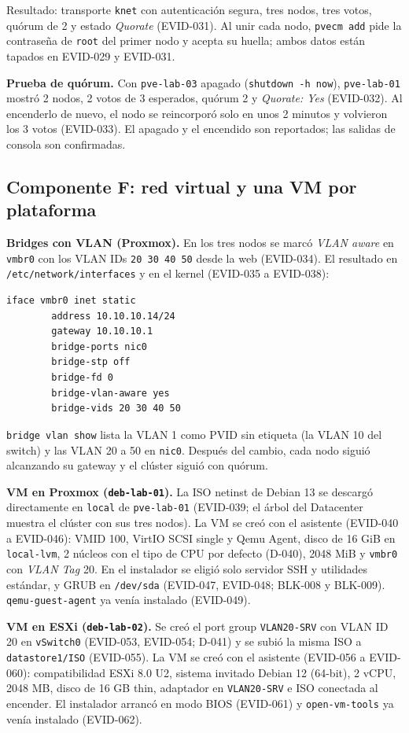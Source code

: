 \documentclass[11pt,a4paper]{article}
\begin{document}
Resultado: transporte \texttt{knet} con autenticación segura, tres nodos, tres votos, quórum de 2 y estado \emph{Quorate} (EVID-031). Al unir cada nodo, \texttt{pvecm add} pide la contraseña de \texttt{root} del primer nodo y acepta su huella; ambos datos están tapados en EVID-029 y EVID-031.

\textbf{Prueba de quórum.} Con \texttt{pve-lab-03} apagado (\texttt{shutdown -h now}), \texttt{pve-lab-01} mostró 2 nodos, 2 votos de 3 esperados, quórum 2 y \emph{Quorate: Yes} (EVID-032). Al encenderlo de nuevo, el nodo se reincorporó solo en unos 2 minutos y volvieron los 3 votos (EVID-033). El apagado y el encendido son reportados; las salidas de consola son confirmadas.

\subsection{Componente F: red virtual y una VM por plataforma}
\textbf{Bridges con VLAN (Proxmox).} En los tres nodos se marcó \emph{VLAN aware} en \texttt{vmbr0} con los VLAN IDs \texttt{20 30 40 50} desde la web (EVID-034). El resultado en \texttt{/etc/network/interfaces} y en el kernel (EVID-035 a EVID-038):
\begin{lstlisting}
iface vmbr0 inet static
        address 10.10.10.14/24
        gateway 10.10.10.1
        bridge-ports nic0
        bridge-stp off
        bridge-fd 0
        bridge-vlan-aware yes
        bridge-vids 20 30 40 50
\end{lstlisting}
\texttt{bridge vlan show} lista la VLAN 1 como PVID sin etiqueta (la VLAN 10 del switch) y las VLAN 20 a 50 en \texttt{nic0}. Después del cambio, cada nodo siguió alcanzando su gateway y el clúster siguió con quórum.

\textbf{VM en Proxmox (\texttt{deb-lab-01}).} La ISO netinst de Debian 13 se descargó directamente en \texttt{local} de \texttt{pve-lab-01} (EVID-039; el árbol del Datacenter muestra el clúster con sus tres nodos). La VM se creó con el asistente (EVID-040 a EVID-046): VMID 100, VirtIO SCSI single y Qemu Agent, disco de 16 GiB en \texttt{local-lvm}, 2 núcleos con el tipo de CPU por defecto (D-040), 2048 MiB y \texttt{vmbr0} con \emph{VLAN Tag} 20. En el instalador se eligió solo servidor SSH y utilidades estándar, y GRUB en \texttt{/dev/sda} (EVID-047, EVID-048; BLK-008 y BLK-009). \texttt{qemu-guest-agent} ya venía instalado (EVID-049).

\textbf{VM en ESXi (\texttt{deb-lab-02}).} Se creó el port group \texttt{VLAN20-SRV} con VLAN ID 20 en \texttt{vSwitch0} (EVID-053, EVID-054; D-041) y se subió la misma ISO a \texttt{datastore1/ISO} (EVID-055). La VM se creó con el asistente (EVID-056 a EVID-060): compatibilidad ESXi 8.0 U2, sistema invitado Debian 12 (64-bit), 2 vCPU, 2048 MB, disco de 16 GB thin, adaptador en \texttt{VLAN20-SRV} e ISO conectada al encender. El instalador arrancó en modo BIOS (EVID-061) y \texttt{open-vm-tools} ya venía instalado (EVID-062).
\end{document}
